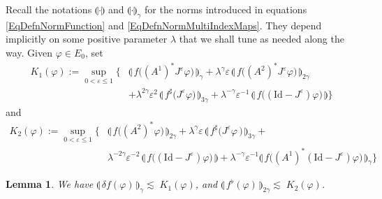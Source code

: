 \documentclass[11pt,a4paper]{amsart}
\renewcommand{\leq}{\leqslant}
\newcommand{\ssk}{\smallskip}
\newtheorem{lem}[thm]{\hspace{-0.15cm}  {\sc Lemma} }%
\numberwithin{equation}{section} %
\begin{document}
Recall the notations $\llparenthesis \cdot\rrparenthesis$ and $\llparenthesis \cdot\rrparenthesis_\gamma$ for the norms introduced in equations \eqref{EqDefnNormFunction} and \eqref{EqDefnNormMultiIndexMaps}. They depend implicitly on some positive parameter $\lambda$ that we shall tune as needed along the way. Given $\varphi\in E_0$, set 
\begin{equation*}
\begin{split}
K_1(\varphi) := \sup_{0 < \varepsilon \leq 1} \Big\{& \llparenthesis\, f\big((A^1)^* J^\varepsilon\varphi\big)\,\rrparenthesis_\gamma
+ \lambda^{\gamma} \varepsilon \, \llparenthesis\, f\big( (A^2)^* J^\varepsilon \varphi\big) \,\rrparenthesis_{2\gamma}  \\ 
&+ \lambda^{2\gamma}\varepsilon^2\, \llparenthesis\, f^\sharp \big(  J^\varepsilon\varphi\big) \,\rrparenthesis_{3\gamma} + \lambda^{-\gamma}\varepsilon^{-1} \,\llparenthesis\, f\big((\textrm{Id} - J^\varepsilon)\varphi\big) \,\rrparenthesis \Big\}
\end{split}
\end{equation*}
and
\begin{equation*}
\begin{split}
K_2(\varphi) := \sup_{0 < \varepsilon \leq 1} \Big\{&  \llparenthesis\, f\big((A^2)^* \varphi) \,\rrparenthesis_{2\gamma}  + \lambda^{\gamma}\varepsilon\,\llparenthesis\, f^\sharp \big(  J^\varepsilon  \varphi\,) \,\rrparenthesis_{3\gamma} + \\ 
& \lambda^{-2\gamma}\varepsilon^{-2} \, \llparenthesis\, f\big((\textrm{Id} - J^\varepsilon) \varphi\big) \,\rrparenthesis + \lambda^{-\gamma} \varepsilon^{-1} \llparenthesis\, f\big((A^1)^*(\textrm{Id} - J^\varepsilon)\varphi\big) \,\rrparenthesis_\gamma  \Big\}
\end{split}
\end{equation*}

\ssk

\begin{lem}
\label{LemmaGeneralImproveEstimates}
We have $\llparenthesis\, \delta f(\varphi) \,\rrparenthesis_\gamma \lesssim\; K_1(\varphi)$, and $\llparenthesis\,  f^\flat(\varphi) \,\rrparenthesis_{2\gamma} \lesssim\; K_2(\varphi)$.
\end{lem}

\medskip
\end{document}

